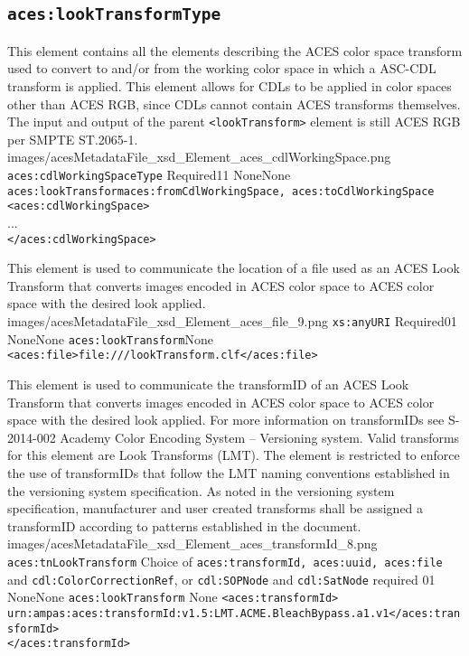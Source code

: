 \subsection{\texttt{aces:lookTransformType}}

        {This element contains all the elements describing the ACES color space transform used to convert to and/or from the working color space in which a ASC-CDL transform is applied. This element allows for CDLs to be applied in color spaces other than ACES RGB, since CDLs cannot contain ACES transforms themselves. The input and output of the parent \texttt{<lookTransform>} element is still ACES RGB per SMPTE ST.2065-1. }
        {images/acesMetadataFile_xsd_Element_aces_cdlWorkingSpace.png}
        {\texttt{aces:cdlWorkingSpaceType}}
        {Required}{1}{1}
        {None}{None}
        {\texttt{aces:lookTransform}}{\texttt{aces:fromCdlWorkingSpace, aces:toCdlWorkingSpace}}
        {\lstinline{<aces:cdlWorkingSpace>} \\
        ... \\
        \lstinline{</aces:cdlWorkingSpace>}}
        
		{This element is used to communicate the location of a file used as an ACES Look Transform that converts images encoded in ACES color space to ACES color space with the desired look applied.}
		{images/acesMetadataFile_xsd_Element_aces_file_9.png}
		{\texttt{xs:anyURI}}
		{Required}{0}{1}
		{None}{None}
		{\texttt{aces:lookTransform}}{None}
		{\lstinline{<aces:file>file:///lookTransform.clf</aces:file>}}

        {This element is used to communicate the transformID of an ACES Look Transform that converts images encoded in ACES color space to ACES color space with the desired look applied.  For more information on transformIDs see S-2014-002 Academy Color Encoding System -- Versioning system.  Valid transforms for this element are Look Transforms (LMT).  The element is restricted to enforce the use of transformIDs that follow the LMT naming conventions established in the versioning system specification.  As noted in the versioning system specification, manufacturer and user created transforms shall be assigned a transformID according to patterns established in the document.}
        {images/acesMetadataFile_xsd_Element_aces_transformId_8.png}
        {\texttt{aces:tnLookTransform}}
        {Choice of \texttt{aces:transformId, aces:uuid, aces:file} and \texttt{cdl:ColorCorrectionRef}, or \texttt{cdl:SOPNode} and \texttt{cdl:SatNode} required}
        {0}{1}
        {None}{None}
        {\texttt{aces:lookTransform}}
        {None}
        {\lstinline{<aces:transformId>}\\
        \lstinline{urn:ampas:aces:transformId:v1.5:LMT.ACME.BleachBypass.a1.v1</aces:transformId>}\\
        \lstinline{</aces:transformId>}
        }
        
